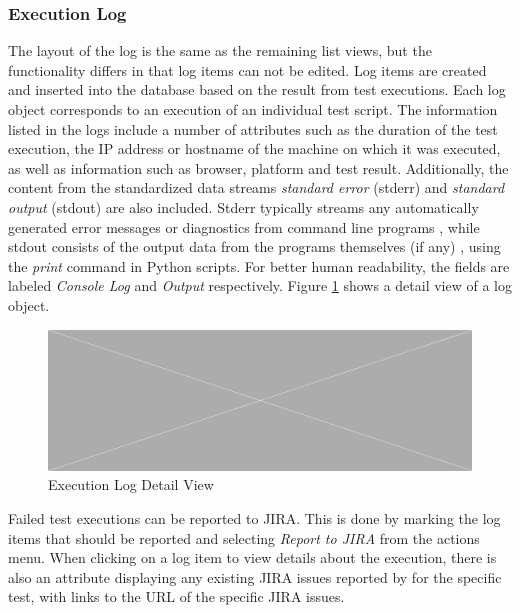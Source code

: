 \subsubsection{Execution Log}

The layout of the log is the same as the remaining list views, but the functionality differs in that log items can not be edited. Log items are created and inserted into the database based on the result from test executions. Each log object corresponds to an execution of an individual test script. The information listed in the logs include a number of attributes such as the duration of the test execution, the IP address or hostname of the machine on which it was executed, as well as information such as browser, platform and test result. Additionally, the content from the standardized data streams \emph{standard error} (stderr) and \emph{standard output} (stdout) are also included. Stderr typically streams any automatically generated error messages or diagnostics from command line programs \cite{http://www.linfo.org/standard_error.html}, while stdout consists of the output data from the programs themselves (if any) \cite{http://www.linfo.org/standard_output.html}, using the \emph{print} command in Python scripts. For better human readability, the fields are labeled \emph{Console Log} and \emph{Output} respectively. Figure \ref{fig.log} shows a detail view of a log object.

\begin{figure}[h]
    \centering
    \includegraphics[width=\textwidth]{figures/placeholder.png}
    \caption{Execution Log Detail View}
    \label{fig.log}
\end{figure}

Failed test executions can be reported to JIRA. This is done by marking the log items that should be reported and selecting \emph{Report to JIRA} from the actions menu. When clicking on a log item to view details about the execution, there is also an attribute displaying any existing JIRA issues reported by \toolname \space for the specific test, with links to the URL of the specific JIRA issues.







